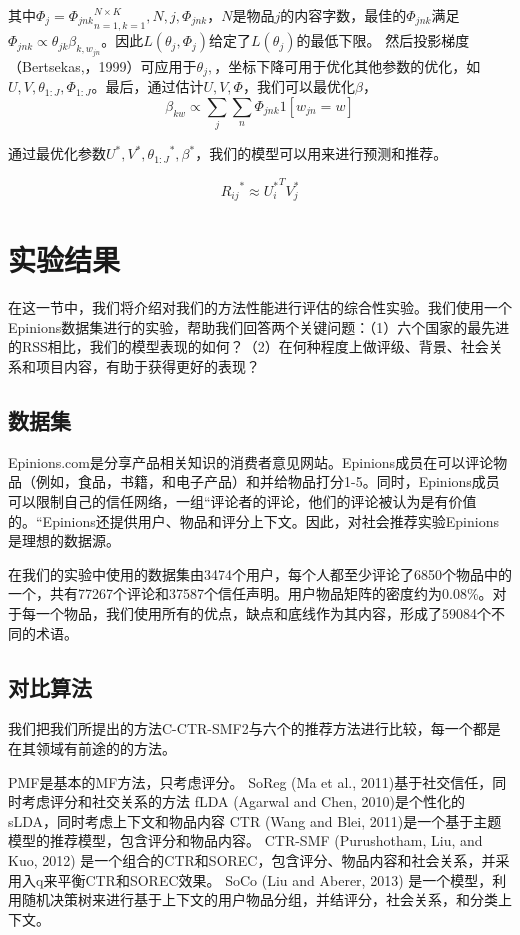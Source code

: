 \documentclass[10pt,a4paper]{article}
\theoremstyle{mythm}%
\numberwithin{equation}{section}
\begin{document}
其中$\Phi_j = {\Phi_{jnk}}_{n=1,k=1}^{N\times K},N,j,\Phi_{jnk}$，$N$是物品$j$的内容字数，最佳的$\Phi_{jnk}$满足$\Phi_{jnk}\propto\theta_{jk}\beta_{k,w_{jn}}$。因此$L(\theta_j,\Phi_j)$给定了$L(\theta_j)$的最低下限。
然后投影梯度（Bertsekas,，1999）可应用于$\theta_j,$，坐标下降可用于优化其他参数的优化，如$U,V,\theta_{1:J},\Phi_{1:J}$。最后，通过估计$U,V,\Phi$，我们可以最优化$\beta$，
$$\beta_{kw}\propto{\sum}_j{\sum}_n\Phi_{jnk}1[w_{jn}=w]$$

通过最优化参数$U^*,V^*,{\theta_{1:J}}^*,\beta^*$，我们的模型可以用来进行预测和推荐。

$${R_{ij}}^* \approx {U_i^*}^TV_j^*$$


\section{实验结果}
在这一节中，我们将介绍对我们的方法性能进行评估的综合性实验。我们使用一个Epinions数据集进行的实验，帮助我们回答两个关键问题：（1）六个国家的最先进的RSS相比，我们的模型表现的如何？（2）在何种程度上做评级、背景、社会关系和项目内容，有助于获得更好的表现？
\subsection{数据集}
Epinions.com是分享产品相关知识的消费者意见网站。Epinions成员在可以评论物品（例如，食品，书籍，和电子产品）和并给物品打分1-5。同时，Epinions成员可以限制自己的信任网络，一组“评论者的评论，他们的评论被认为是有价值的。“Epinions还提供用户、物品和评分上下文。因此，对社会推荐实验Epinions是理想的数据源。

在我们的实验中使用的数据集由3474个用户，每个人都至少评论了6850个物品中的一个，共有77267个评论和37587个信任声明。用户物品矩阵的密度约为0.08\%。对于每一个物品，我们使用所有的优点，缺点和底线作为其内容，形成了59084个不同的术语。
\subsection{对比算法}

我们把我们所提出的方法C-CTR-SMF2与六个的推荐方法进行比较，每一个都是在其领域有前途的的方法。

PMF是基本的MF方法，只考虑评分。
SoReg (Ma et al., 2011)基于社交信任，同时考虑评分和社交关系的方法
fLDA (Agarwal and Chen, 2010)是个性化的sLDA，同时考虑上下文和物品内容
CTR (Wang and Blei, 2011)是一个基于主题模型的推荐模型，包含评分和物品内容。
CTR-SMF (Purushotham, Liu, and Kuo, 2012) 是一个组合的CTR和SOREC，包含评分、物品内容和社会关系，并采用入q来平衡CTR和SOREC效果。
SoCo (Liu and Aberer, 2013) 是一个模型，利用随机决策树来进行基于上下文的用户物品分组，并结评分，社会关系，和分类上下文。
\end{document}
